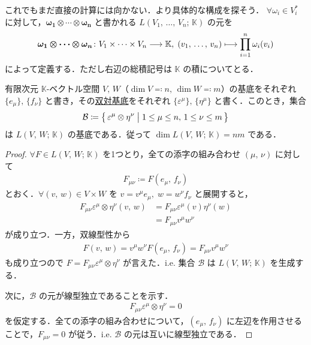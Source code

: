\documentclass[rep_main]{subfiles}
\begin{document}
これでもまだ直接の計算には向かない．より具体的な構成を探そう．
$\forall \omega_i \in V_i^*$ に対して，$\bm{\omega_1 \otimes \cdots \otimes \omega_n}$ と書かれる $L(V_1,\, \dots,\, V_n;\, \mathbb{K})$ の元を
\begin{align}
	\bm{\omega_1 \otimes \cdots \otimes \omega_n} \colon V_1 \times \cdots \times V_n \longrightarrow \mathbb{K},\; (v_1,\, \dots,\, v_n) \longmapsto \prod_{i=1}^n \omega_i(v_i)
\end{align}
によって定義する．ただし右辺の総積記号は $\mathbb{K}$ の積についてとる．

\begin{myprop}[label=prop:basis-L]{}
	有限次元 $\mathbb{K}$-ベクトル空間 $V,\, W$（$\dim V \eqqcolon n,\, \dim W \eqqcolon m$）の基底をそれぞれ $\{e_\mu\},\, \{f_\nu\}$ と書き，その\hyperref[def.basisforDVS]{双対基底}をそれぞれ $\{\varepsilon^\mu\},\, \{\eta^\mu\}$ と書く．このとき，集合
	\begin{align}
		\mathcal{B} \coloneqq \bigl\{\, \varepsilon^\mu \otimes \eta^\nu \bigm| 1 \le \mu \le n,\, 1 \le \nu \le m \,\bigr\} 
	\end{align}
	は $L(V,\, W;\, \mathbb{K})$ の基底である．従って $\dim L(V,\, W;\, \mathbb{K}) = nm$ である．
\end{myprop}

\begin{proof}
	$\forall F  \in L(V,\, W;\, \mathbb{K})$ を1つとり，全ての添字の組み合わせ $(\mu,\, \nu)$ に対して
	\begin{align}
		F_{\mu\nu} \coloneqq F(e_\mu,\, f_\nu)
	\end{align}
	とおく．$\forall (v,\, w) \in V \times W$ を $v = v^\mu e_\mu,\; w = w^\nu f_\nu$ と展開すると，
	\begin{align}
		F_{\mu\nu} \varepsilon^\mu \otimes \eta^\nu (v,\, w) &= F_{\mu\nu} \varepsilon^{\mu}(v) \eta^\nu(w) \\
		&= F_{\mu\nu} v^\mu w^\nu
	\end{align}
	が成り立つ．一方，双線型性から
	\begin{align}
		F(v,\, w) = v^\mu w^\nu F(e_\mu,\, f_\nu) = F_{\mu\nu} v^\mu w^\nu
	\end{align}
	も成り立つので $F = F_{\mu\nu} \varepsilon^\mu \otimes \eta^\nu$ が言えた．i.e. 集合 $\mathcal{B}$ は $L(V,\, W;\, \mathbb{K})$ を生成する．

	次に，$\mathcal{B}$ の元が線型独立であることを示す．
	\begin{align}
		F_{\mu\nu} \varepsilon^\mu \otimes \eta^\nu = 0
	\end{align}
	を仮定する．全ての添字の組み合わせについて，$(e_\mu,\, f_\nu)$ に左辺を作用させることで，$F_{\mu\nu} = 0$ が従う．i.e. $\mathcal{B}$ の元は互いに線型独立である．
\end{proof}
\end{document}
